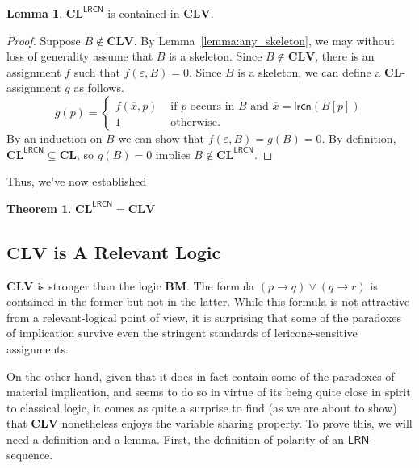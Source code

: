 \documentclass{amsart}
\newtheorem{theorem}{Theorem}
\theoremstyle{definition}
\newtheorem{lemma}{Lemma}
\newcommand{\LRN}{\mathsf{LRN}}
\newcommand{\lrcn}{\mathsf{lrcn}}
\newcommand{\LRCN}{\mathsf{LRCN}}
\newcommand{\CLV}{\mathbf{CLV}}
\newcommand{\logic}[1]{{\ensuremath {\mathbf{#1}}}}
\newcommand{\lrcnclose}[1]{#1^{\LRCN}}
\begin{document}
\begin{lemma}\label{Lemma:SubstitutionsContainedInValid}
$\lrcnclose{\logic{CL}}$ is contained in $\CLV$. 
\end{lemma}
\begin{proof}
Suppose $B\not\in\CLV$. By Lemma~\ref{lemma:any_skeleton}, we may without loss of generality assume that $B$ is a skeleton.
Since $B\not\in\CLV$, there is an assignment $f$ such that $f(\varepsilon,B)=0$.
Since $B$ is a skeleton, we can define a \logic{CL}-assignment $g$ as follows. 
\[
g(p)=\left\{
        \begin{array}{rl}
            f(\overline{x},p) & \text{ if } p \text{ occurs in $B$ and $\overline{x}=\lrcn(B[p])$} \\
            1 & \text{ otherwise}.
        \end{array}\right.
\]
By an induction on $B$ we can show that $f(\varepsilon, B)=g(B)=0$.
By definition, $\lrcnclose{\logic{CL}}\subseteq \logic{CL}$, so $g(B)=0$ implies $B\not\in\lrcnclose{\logic{CL}}$.

\end{proof}

Thus, we've now established\
\begin{theorem}
    $\lrcnclose{\logic{CL}}=\CLV$
\end{theorem}

    \subsection{$\CLV$ is A Relevant Logic}\label{sec:CLV_is_relevant}
    
    $\CLV$ is stronger than the logic \logic{BM}. 
The formula  $(p\to q)\lor(q\to r)$ is contained in the former but not in the latter. While this formula is not  attractive from a relevant-logical point of view, it is surprising that some of the paradoxes of implication survive even the stringent standards of lericone-sensitive assignments. 

    On the other hand, given that it does in fact contain some of the paradoxes of material implication, and seems to do so in virtue of its being quite close in spirit to classical logic, it comes as quite a surprise to find (as we are about to show) that $\CLV$ nonetheless enjoys the variable sharing property. To prove this, we will need a  definition and a lemma. First, the definition of polarity of an $\LRN$-sequence.
\end{document}
